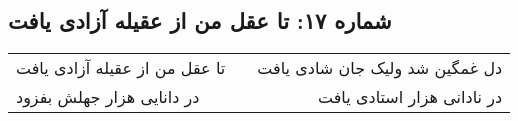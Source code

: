 \begin{center}
\section*{شماره ۱۷: تا عقل من از عقیله آزادی یافت}
\label{sec:017}
\begin{longtable}{l p{0.5cm} r}
تا عقل من از عقیله آزادی یافت
&&
دل غمگین شد ولیک جان شادی یافت
\\
در دانایی هزار جهلش بفزود
&&
در نادانی هزار استادی یافت
\\
\end{longtable}
\end{center}
